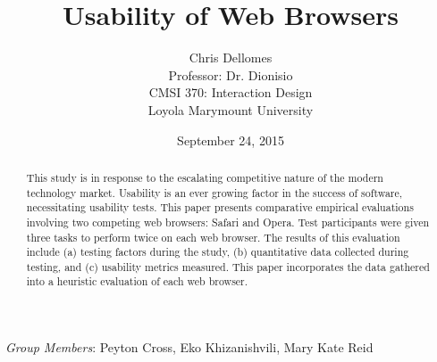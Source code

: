 \documentclass{article}
\begin{document}
\title{Usability of Web Browsers}
\author{Chris Dellomes\\
Professor: Dr. Dionisio\\
CMSI 370: Interaction Design\\
	Loyola Marymount University}

\date{September 24, 2015}

\maketitle

\begin{center}
\begin{abstract}
\noindent This study is in response to the escalating competitive nature of the modern technology market. Usability is an ever growing factor in the success of software, necessitating usability tests. This paper presents comparative empirical evaluations involving two competing web browsers: Safari and Opera. Test participants were given three tasks to perform twice on each web browser. The results of this evaluation include (a) testing factors during the study, (b) quantitative data collected during testing, and (c) usability metrics measured. This paper incorporates the data gathered into a heuristic evaluation of each web browser.
\end{abstract}


\bigskip

\textit{Group Members}: Peyton Cross, Eko Khizanishvili, Mary Kate Reid
\end{center}

\thispagestyle{empty}

\clearpage

\setcounter{page}{1}
\end{document}
